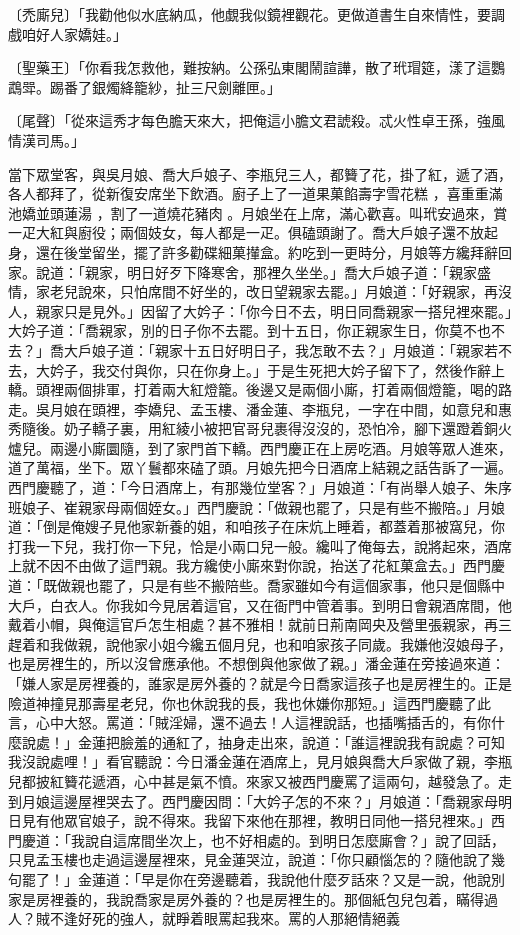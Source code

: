 〔禿廝兒〕「我勸他似水底納瓜，他覷我似鏡裡觀花。更做道書生自來情性，要調戲咱好人家嬌娃。」

〔聖藥王〕「你看我怎救他，難按納。公孫弘東閣鬧諠譁，散了玳瑁筵，漾了這鸚鵡斝。踢番了銀燭絳籠紗，扯三尺劍離匣。」

〔尾聲〕「從來這秀才每色膽天來大，把俺這小膽文君諕殺。忒火性卓王孫，強風情漢司馬。」

當下眾堂客，與吳月娘、喬大戶娘子、李瓶兒三人，都籫了花，掛了紅，遞了酒，各人都拜了，從新復安席坐下飲酒。廚子上了一道果菓餡壽字雪花糕 ，喜重重滿池嬌並頭蓮湯 ，割了一道燒花豬肉 。月娘坐在上席，滿心歡喜。叫玳安過來，賞一疋大紅與廚役；兩個妓女，每人都是一疋。俱磕頭謝了。喬大戶娘子還不放起身，還在後堂留坐，擺了許多勸碟細菓攆盒。約吃到一更時分，月娘等方纔拜辭回家。說道：「親家，明日好歹下降寒舍，那裡久坐坐。」喬大戶娘子道：「親家盛情，家老兒說來，只怕席間不好坐的，改日望親家去罷。」月娘道：「好親家，再沒人，親家只是見外。」因留了大妗子：「你今日不去，明日同喬親家一搭兒裡來罷。」大妗子道：「喬親家，別的日子你不去罷。到十五日，你正親家生日，你莫不也不去？」喬大戶娘子道：「親家十五日好明日子，我怎敢不去？」月娘道：「親家若不去，大妗子，我交付與你，只在你身上。」于是生死把大妗子留下了，然後作辭上轎。頭裡兩個排軍，打着兩大紅燈籠。後邊又是兩個小廝，打着兩個燈籠，喝的路走。吳月娘在頭裡，李嬌兒、孟玉樓、潘金蓮、李瓶兒，一字在中間，如意兒和惠秀隨後。奶子轎子裏，用紅綾小被把官哥兒裹得沒沒的，恐怕冷，腳下還蹬着銅火爐兒。兩邊小廝圜隨，到了家門首下轎。西門慶正在上房吃酒。月娘等眾人進來，道了萬福，坐下。眾丫鬟都來磕了頭。月娘先把今日酒席上結親之話告訴了一遍。西門慶聽了，道：「今日酒席上，有那幾位堂客？」月娘道：「有尚舉人娘子、朱序班娘子、崔親家母兩個姪女。」西門慶說：「做親也罷了，只是有些不搬陪。」月娘道：「倒是俺嫂子見他家新養的姐，和咱孩子在床炕上睡着，都蓋着那被窩兒，你打我一下兒，我打你一下兒，恰是小兩口兒一般。纔叫了俺每去，說將起來，酒席上就不因不由做了這門親。我方纔使小廝來對你說，抬送了花紅菓盒去。」西門慶道：「既做親也罷了，只是有些不搬陪些。喬家雖如今有這個家事，他只是個縣中大戶，白衣人。你我如今見居着這官，又在衙門中管着事。到明日會親酒席間，他戴着小帽，與俺這官戶怎生相處？甚不雅相！就前日荊南岡央及營里張親家，再三趕着和我做親，說他家小姐今纔五個月兒，也和咱家孩子同歲。我嫌他沒娘母子，也是房裡生的，所以沒曾應承他。不想倒與他家做了親。」潘金蓮在旁接過來道：「嫌人家是房裡養的，誰家是房外養的？就是今日喬家這孩子也是房裡生的。正是險道神撞見那壽星老兒，你也休說我的長，我也休嫌你那短。」這西門慶聽了此言，心中大怒。罵道：「賊淫婦，還不過去！人這裡說話，也插嘴插舌的，有你什麼說處！」金蓮把臉羞的通紅了，抽身走出來，說道：「誰這裡說我有說處？可知我沒說處哩！」看官聽說：今日潘金蓮在酒席上，見月娘與喬大戶家做了親，李瓶兒都披紅籫花遞酒，心中甚是氣不憤。來家又被西門慶罵了這兩句，越發急了。走到月娘這邊屋裡哭去了。西門慶因問：「大妗子怎的不來？」月娘道：「喬親家母明日見有他眾官娘子，說不得來。我留下來他在那裡，教明日同他一搭兒裡來。」西門慶道：「我說自這席間坐次上，也不好相處的。到明日怎麼廝會？」說了回話，只見孟玉樓也走過這邊屋裡來，見金蓮哭泣，說道：「你只顧惱怎的？隨他說了幾句罷了！」金蓮道：「早是你在旁邊聽着，我說他什麼歹話來？又是一說，他說別家是房裡養的，我說喬家是房外養的？也是房裡生的。那個紙包兒包着，瞞得過人？賊不逢好死的強人，就睜着眼罵起我來。罵的人那絕情絕義